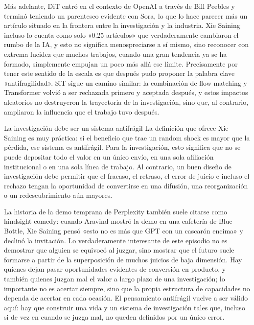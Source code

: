 \documentclass[a4paper,12pt]{article}
\begin{document}
Más adelante, DiT entró en el contexto de OpenAI a través de Bill Peebles y terminó teniendo un parentesco evidente con Sora, lo que lo hace parecer más un artículo situado en la frontera entre la investigación y la industria. Xie Saining incluso lo cuenta como solo «0.25 artículos» que verdaderamente cambiaron el rumbo de la IA, y esto no significa menospreciarse a sí mismo, sino reconocer con extrema lucidez que muchos trabajos, cuando una gran tendencia ya se ha formado, simplemente empujan un poco más allá ese límite. Precisamente por tener este sentido de la escala es que después pudo proponer la palabra clave «antifragilidad». SiT sigue un camino similar: la combinación de flow matching y Transformer volvió a ser rechazada primero y aceptada después, y estos impactos aleatorios no destruyeron la trayectoria de la investigación, sino que, al contrario, ampliaron la influencia que el trabajo tuvo después.

\begin{importantbox}{La investigación debe ser un sistema antifrágil}
La definición que ofrece Xie Saining es muy práctica: si el beneficio que trae un random shock es mayor que la pérdida, ese sistema es antifrágil. Para la investigación, esto significa que no se puede depositar todo el valor en un único envío, en una sola afiliación institucional o en una sola línea de trabajo. Al contrario, un buen diseño de investigación debe permitir que el fracaso, el retraso, el error de juicio e incluso el rechazo tengan la oportunidad de convertirse en una difusión, una reorganización o un redescubrimiento aún mayores.
\end{importantbox}

La historia de la demo temprana de Perplexity también suele citarse como hindsight comedy: cuando Aravind mostró la demo en una cafetería de Blue Bottle, Xie Saining pensó «esto no es más que GPT con un cascarón encima» y declinó la invitación. Lo verdaderamente interesante de este episodio no es demostrar que alguien se equivocó al juzgar, sino mostrar que el futuro suele formarse a partir de la superposición de muchos juicios de baja dimensión. Hay quienes dejan pasar oportunidades evidentes de conversión en producto, y también quienes juzgan mal el valor a largo plazo de una investigación; lo importante no es acertar siempre, sino que la propia estructura de capacidades no dependa de acertar en cada ocasión. El pensamiento antifrágil vuelve a ser válido aquí: hay que construir una vida y un sistema de investigación tales que, incluso si de vez en cuando se juzga mal, no queden definidos por un único error.
\end{document}
